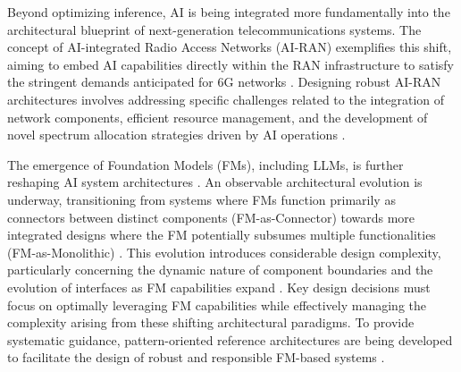 \documentclass[sigconf]{acmart}
\begin{document}
Beyond optimizing inference, AI is being integrated more fundamentally into the architectural blueprint of next-generation telecommunications systems. The concept of AI-integrated Radio Access Networks (AI-RAN) exemplifies this shift, aiming to embed AI capabilities directly within the RAN infrastructure to satisfy the stringent demands anticipated for 6G networks \cite{ref34}. Designing robust AI-RAN architectures involves addressing specific challenges related to the integration of network components, efficient resource management, and the development of novel spectrum allocation strategies driven by AI operations \cite{ref34}.

The emergence of Foundation Models (FMs), including LLMs, is further reshaping AI system architectures \cite{ref16}. An observable architectural evolution is underway, transitioning from systems where FMs function primarily as connectors between distinct components (FM-as-Connector) towards more integrated designs where the FM potentially subsumes multiple functionalities (FM-as-Monolithic) \cite{ref16}. This evolution introduces considerable design complexity, particularly concerning the dynamic nature of component boundaries and the evolution of interfaces as FM capabilities expand \cite{ref16}. Key design decisions must focus on optimally leveraging FM capabilities while effectively managing the complexity arising from these shifting architectural paradigms. To provide systematic guidance, pattern-oriented reference architectures are being developed to facilitate the design of robust and responsible FM-based systems \cite{ref16}.
\end{document}
